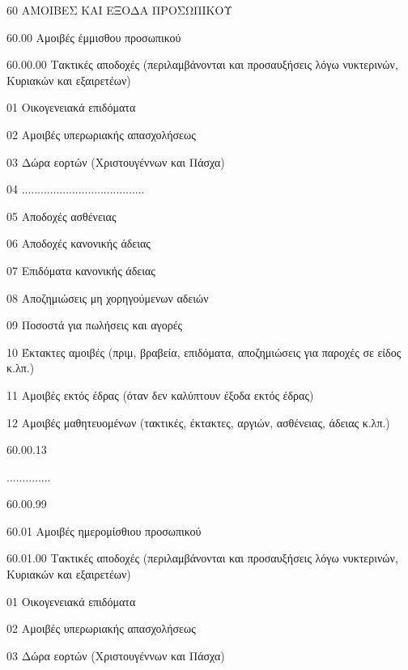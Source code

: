 \documentclass[A4,10pt,greek]{book}
\begin{document}
 60   ΑΜΟΙΒΕΣ ΚΑΙ ΕΞΟΔΑ ΠΡΟΣΩΠΙΚΟΥ

        60.00   Αμοιβές έμμισθου προσωπικού

                    60.00.00   Τακτικές αποδοχές (περιλαμβάνονται και προσαυξήσεις λόγω
                                       νυκτερινών, Κυριακών και εξαιρετέων)

                               01   Οικογενειακά επιδόματα

                               02   Αμοιβές υπερωριακής απασχολήσεως

                               03   Δώρα εορτών (Χριστουγέννων και Πάσχα)

                               04   .......................................

                               05   Αποδοχές ασθένειας

                               06   Αποδοχές κανονικής άδειας

                               07   Επιδόματα κανονικής άδειας

                               08   Αποζημιώσεις μη χορηγούμενων αδειών

                               09   Ποσοστά για πωλήσεις και αγορές

                               10   Έκτακτες αμοιβές (πριμ, βραβεία, επιδόματα, αποζημιώσεις για
                                       παροχές σε είδος κ.λπ.)

                               11   Αμοιβές εκτός έδρας (όταν δεν καλύπτουν έξοδα εκτός έδρας)

                               12   Αμοιβές μαθητευομένων (τακτικές, έκτακτες, αργιών,
                                       ασθένειας, άδειας κ.λπ.)

                    60.00.13

                    ..............

                    60.00.99

        60.01    Αμοιβές ημερομίσθιου προσωπικού

                    60.01.00   Τακτικές αποδοχές (περιλαμβάνονται και προσαυξήσεις λόγω
                                      νυκτερινών, Κυριακών και εξαιρετέων)

                               01   Οικογενειακά επιδόματα

                               02   Αμοιβές υπερωριακής απασχολήσεως

                               03   Δώρα εορτών (Χριστουγέννων και Πάσχα)
\end{document}
